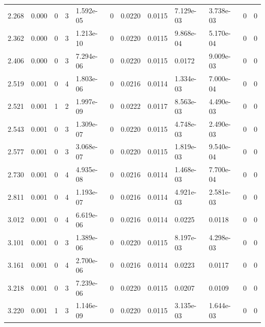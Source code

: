 \documentclass[preview]{standalone}
\begin{document}
{{\begin{tabular}{L{1.2cm}C{1.2cm} C{0.3cm}C{0.5cm} C{1.4cm}C{1.4cm} C{1.4cm}C{1.4cm} C{1.6cm}C{1.6cm} C{1.6cm}C{1.6cm}}
  2.268  &  0.000  & 0     &  3 &  1.592e-05  & 0  &  0.0220&   0.0115& 7.129e-03 & 3.738e-03   &  0 & 0  \\ 
  2.362  &  0.000  & 0     &  3 &  1.213e-10  & 0  &  0.0220&   0.0115& 9.868e-04 & 5.170e-04   &  0 & 0  \\ 
  2.406  &  0.000  & 0     &  3 &  7.294e-06  & 0  &  0.0220&   0.0115& 0.0172 & 9.009e-03   &  0 & 0  \\ 
  2.519  &  0.001  & 0     &  4 &  1.803e-06  & 0  &  0.0216&   0.0114& 1.334e-03 & 7.000e-04   &  0 & 0  \\ 
  2.521  &  0.001  & 1     &  2 &  1.997e-09  & 0  &  0.0222&   0.0117& 8.563e-03 & 4.490e-03   &  0 & 0  \\ 
  2.543  &  0.001  & 0     &  3 &  1.309e-07  & 0  &  0.0220&   0.0115& 4.748e-03 & 2.490e-03   &  0 & 0  \\ 
  2.577  &  0.001  & 0     &  3 &  3.068e-07  & 0  &  0.0220&   0.0115& 1.819e-03 & 9.540e-04   &  0 & 0  \\ 
  2.730  &  0.001  & 0     &  4 &  4.935e-08  & 0  &  0.0216&   0.0114& 1.468e-03 & 7.700e-04   &  0 & 0  \\ 
  2.811  &  0.001  & 0     &  4 &  1.193e-07  & 0  &  0.0216&   0.0114& 4.921e-03 & 2.581e-03   &  0 & 0  \\ 
  3.012  &  0.001  & 0     &  4 &  6.619e-06  & 0  &  0.0216&   0.0114& 0.0225 & 0.0118   &  0 & 0  \\ 
  3.101  &  0.001  & 0     &  3 &  1.389e-06  & 0  &  0.0220&   0.0115& 8.197e-03 & 4.298e-03   &  0 & 0  \\ 
  3.161  &  0.001  & 0     &  4 &  2.700e-06  & 0  &  0.0216&   0.0114& 0.0223 & 0.0117   &  0 & 0  \\ 
  3.218  &  0.001  & 0     &  3 &  7.239e-06  & 0  &  0.0220&   0.0115& 0.0207 & 0.0109   &  0 & 0  \\ 
  3.220  &  0.001  & 1     &  3 &  1.146e-09  & 0  &  0.0220&   0.0115& 3.135e-03 & 1.644e-03   &  0 & 0  \\ 
\hline 
\end{tabular} 

}}
\end{document}
